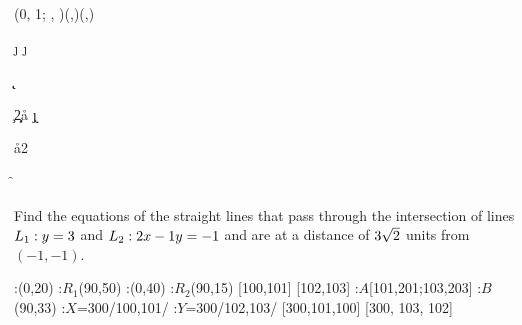 



\MULTIPLY{}\a
\SOLVELINEARSYSTEM(0, 1; \vbtwo, \vbthree)(\vbone,\vbfour)(\p,\q)

\ADD{}\j
\SQUARE\j\jj

\ADD{}\k
\SQUARE\k\kk

\SQUARE\vbfive\c
\MULTIPLY\c{2}\d

\SUBTRACT\d\jj\aa
\MULTIPLY\j\k\x
\MULTIPLY{}\bb
\SUBTRACT\d\kk\cc

\gcalcexpr[0]
\MULTIPLY{}\mbb
\MULTIPLY\aa{2}\dnm

\ADD\mbb\disc\f
\SUBTRACT\mbb\disc\g


\question[4] Find the equations of the straight lines that pass
 through the intersection of lines $L_1: y=3$ and 
 $L_2: 2 x -1 y = -1$ and are at a distance of $3\sqrt{2}$
 units from $(-1, -1)$.


\watchout

\ifprintanswers
  \begin{marginfigure}[+40 pt]
      :(0,20)
      :$R_1$(90,50)
      :(0,40)
      :$R_2$(90,15)
      [100,101]
      [102,103]
      :$A$[101,201;103,203] %
      :$B$ (90,33)
      :$X$=300/100,101/
      :$Y$=300/102,103/
    \figdrawbegin{}
      \figdrawline [100,101]
      \figdrawline [102,103]
       [300,101,100]
       [300, 103, 102]
    \figdrawend
    \centerline{\box\figBoxA}
  \end{marginfigure}
\fi 

